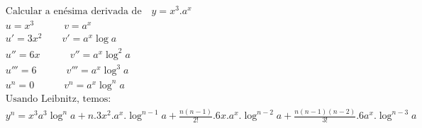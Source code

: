 \begin{ex}
\begin{align}
&\text{Calcular a enésima derivada de} \quad y=x^3.a^x\nonumber\\
&u=x^3 \quad\quad\quad v=a^x\nonumber\\
&u'=3x^2 \quad\quad v'=a^{x}\log{a}\nonumber\\
&u''=6x\quad\quad\quad v''=a^{x}\log^2{a}\nonumber\\
&u'''=6 \quad\quad\quad v'''=a^{x}\log^3{a}\nonumber\\
&u^{n}=0 \quad\quad\quad v^{n}=a^{x}\log^{n}{a}\nonumber\\
&\text{Usando Leibnitz, temos:}\nonumber\\
&y^{n}=x^3a^3\log^{n}{a}+n.3x^2.a^{x}.\log^{n-1}{a}+\frac{n(n-1)}{2!}.6x.a^{x}.\log^{n-2}{a}+\frac{n(n-1)(n-2)}{3!}.6a^{x}.\log^{n-3}{a}\nonumber
\end{align}
\end{ex}